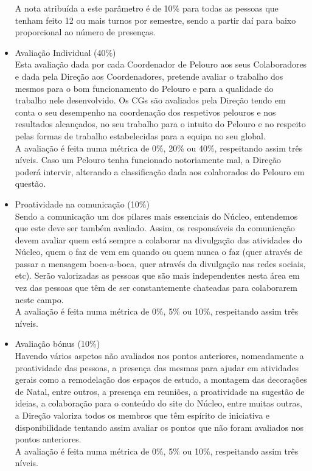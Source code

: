 \begin{itemize}
A nota atribuída a este parâmetro é de 10\% para todas as pessoas que tenham feito 12 ou mais turnos por semestre, sendo a partir daí para baixo proporcional ao número de presenças.
\item Avaliação Individual (40\%)\\
Esta avaliação dada por cada Coordenador de Pelouro aos seus Colaboradores e dada pela Direção aos Coordenadores, pretende avaliar o trabalho dos mesmos para o bom funcionamento do Pelouro e para a qualidade do trabalho nele desenvolvido. Os CGs são avaliados pela Direção tendo em conta o seu desempenho na coordenação dos respetivos pelouros e nos resultados alcançados, no seu trabalho para o intuito do Pelouro e no respeito pelas formas de trabalho estabelecidas para a equipa no seu global.\\
A avaliação é feita numa métrica de 0\%, 20\% ou 40\%, respeitando assim três níveis. Caso um Pelouro tenha funcionado notoriamente mal, a Direção poderá intervir, alterando a classificação dada aos colaborados do Pelouro em questão.
\item Proatividade na comunicação (10\%)\\
Sendo a comunicação um dos pilares mais essenciais do Núcleo, entendemos que este deve ser também avaliado. Assim, os responsáveis da comunicação devem avaliar quem está sempre a colaborar na divulgação das atividades do Núcleo, quem o faz de vem em quando ou quem nunca o faz (quer através de passar a mensagem boca-a-boca, quer através da divulgação nas redes sociais, etc). Serão valorizadas as pessoas que são mais independentes nesta área em vez das pessoas que têm de ser constantemente chateadas para colaborarem neste campo.\\
A avaliação é feita numa métrica de 0\%, 5\% ou 10\%, respeitando assim três níveis.
\item Avaliação bónus (10\%)\\
Havendo vários aspetos não avaliados nos pontos anteriores, nomeadamente a proatividade das pessoas, a presença das mesmas para ajudar em atividades gerais como a remodelação dos espaços de estudo, a montagem das decorações de Natal, entre outros, a presença em reuniões, a proatividade na sugestão de ideias, a colaboração para o conteúdo do site do Núcleo, entre muitas outras, a Direção valoriza todos os membros que têm espírito de iniciativa e disponibilidade tentando assim avaliar os pontos que não foram avaliados nos pontos anteriores.\\
A avaliação é feita numa métrica de 0\%, 5\% ou 10\%, respeitando assim três níveis.
\end{itemize}
